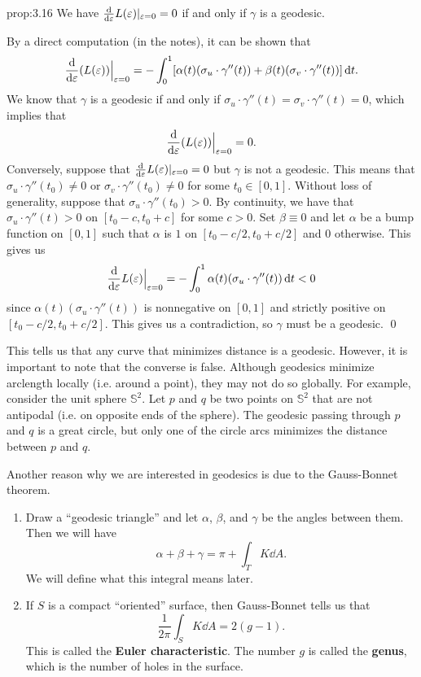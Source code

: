 \begin{prop}{prop:3.16}
    We have $\frac{\rm d}{{\rm d}\varepsilon} L(\varepsilon)|_{\varepsilon=0} = 0$ if and only 
    if $\gamma$ is a geodesic. 
\end{prop}\vspace{-0.25cm} 
\begin{pf}
    By a direct computation (in the notes), it can be shown that 
    \[ \frac{\rm d}{{\rm d}\varepsilon} (L(\varepsilon)) \Big|_{\varepsilon=0} 
    = -\int_0^1 [\alpha(t) (\sigma_u \cdot \gamma''(t)) + 
    \beta(t) (\sigma_v \cdot \gamma''(t))]\,\mathrm{d} t. \] 
    We know that $\gamma$ is a geodesic if and only if 
    $\sigma_u \cdot \gamma''(t) = \sigma_v \cdot \gamma''(t) = 0$, 
    which implies that 
    \[ \frac{\rm d}{{\rm d}\varepsilon} (L(\varepsilon)) \Big|_{\varepsilon=0} = 0. \] 
    Conversely, suppose that $\frac{\rm d}{{\rm d}\varepsilon} L(\varepsilon)|_{\varepsilon=0} = 0$
    but $\gamma$ is not a geodesic. This means that 
    $\sigma_u \cdot \gamma''(t_0) \neq 0$ or $\sigma_v \cdot \gamma''(t_0) \neq 0$ 
    for some $t_0 \in [0, 1]$. Without loss of generality, 
    suppose that $\sigma_u \cdot \gamma''(t_0) > 0$. 
    By continuity, we have that $\sigma_u \cdot \gamma''(t) > 0$ 
    on $[t_0 - c, t_0 + c]$ for some $c > 0$. Set $\beta \equiv 0$ 
    and let $\alpha$ be a bump function on $[0, 1]$ such that 
    $\alpha$ is $1$ on $[t_0 - c/2, t_0 + c/2]$ and $0$ otherwise. This 
    gives us 
    \[ \frac{\rm d}{{\rm d}\varepsilon} L(\varepsilon)\Big|_{\varepsilon=0} = -\int_0^1 
    \alpha(t) (\sigma_u \cdot \gamma''(t))\,\mathrm{d} t < 0 \] 
    since $\alpha(t) (\sigma_u \cdot \gamma''(t))$ is nonnegative 
    on $[0, 1]$ and strictly positive on $[t_0 - c/2, t_0 + c/2]$. 
    This gives us a contradiction, so $\gamma$ must be a geodesic. \qed 
\end{pf}\vspace{-0.25cm}

This tells us that any curve that minimizes distance is a geodesic. 
However, it is important to note that the converse is false. Although 
geodesics minimize arclength locally (i.e. around a point), they 
may not do so globally. 
For example, consider the unit sphere $\mathbb{S}^2$. Let $p$ and 
$q$ be two points on $\mathbb{S}^2$ that are not antipodal (i.e. 
on opposite ends of the sphere). The geodesic passing through 
$p$ and $q$ is a great circle, but only one of the circle arcs 
minimizes the distance between $p$ and $q$. 

Another reason why we are interested in geodesics is due to the Gauss-Bonnet 
theorem.
\begin{enumerate}[(1)]
    \item Draw a ``geodesic triangle'' and let $\alpha$, $\beta$, and $\gamma$ 
    be the angles between them. Then we will have 
    \[ \alpha + \beta + \gamma = \pi + \int_T K\dd A. \] 
    We will define what this integral means later. 

    \item If $S$ is a compact ``oriented'' surface, then Gauss-Bonnet 
    tells us that 
    \[ \frac{1}{2\pi} \int_S K\dd A = 2(g-1). \] 
    This is called the {\bf Euler characteristic}. The
    number $g$ is called the {\bf genus}, which is the number of 
    holes in the surface. 
\end{enumerate}